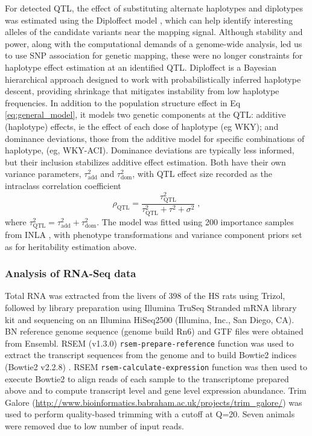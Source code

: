 For detected QTL, the effect of substituting alternate haplotypes and diplotypes was estimated using the Diploffect model \citep{Zhang2014}, which can help identify interesting alleles of the candidate variants near the mapping signal.  Although stability and power, along with the computational demands of a genome-wide analysis, led us to use SNP association for genetic mapping, these were no longer constraints for haplotype effect estimation at an identified QTL. Diploffect is a Bayesian hierarchical approach designed to work with probabilistically inferred haplotype descent, providing shrinkage that mitigates instability from low haplotype frequencies. In addition to the population structure effect in Eq \ref{eq:general_model}, it models two genetic components at the QTL: additive (haplotype) effects, ie the effect of each dose of haplotype (eg WKY); and dominance deviations, those from the additive model for specific combinations of haplotype, (eg, WKY-ACI). Dominance deviations are typically less informed, but their inclusion stabilizes additive effect estimation. Both have their own variance parameters, $\tau^{2}_{\text{add}}$ and $\tau^{2}_{\text{dom}}$, with QTL effect size recorded as the intraclass correlation coefficient 
\[
\rho_{\text{QTL}} = \frac{\tau^{2}_{\text{QTL}}}{\tau^{2}_{\text{QTL}} + \tau^{2} + \sigma^{2}}\;,
\]
where $\tau^{2}_{\text{QTL}} = \tau^{2}_{\text{add}} + \tau^{2}_{\text{dom}}$. The model was fitted using 200 importance samples from INLA \citep{Rue2009a,Holand2013a}, with phenotype transformations and variance component priors set as for heritability estimation above.

\subsubsection{Analysis of RNA-Seq data}

Total RNA was extracted from the livers of 398 of the HS rats using Trizol, followed by library preparation using Illumina TruSeq Stranded mRNA library kit and sequencing on an Illumina HiSeq2500 (Illumina, Inc., San Diego, CA). BN reference genome sequence (genome build Rn6) and GTF files were obtained from Ensembl. RSEM (v1.3.0) \texttt{rsem-prepare-reference} function was used to extract the transcript sequences from the genome \citep{Li2011a} and to build Bowtie2 indices (Bowtie2 v2.2.8) \citep{Langmead2012}.  RSEM \texttt{rsem-calculate-expression} function was then used to execute Bowtie2 to align reads of each sample to the transcriptome prepared above and to compute transcript level and gene level expression abundance.  Trim Galore (\url{http://www.bioinformatics.babraham.ac.uk/projects/trim\_galore/}) was used to perform quality-based trimming with a cutoff at Q=20.  Seven animals were removed due to low number of input reads.

